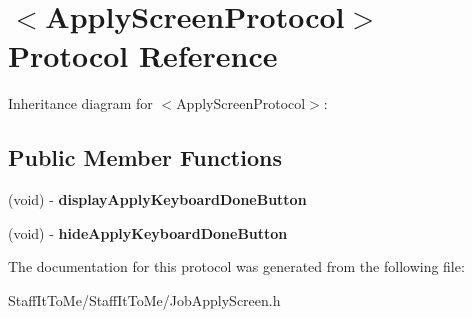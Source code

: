 \hypertarget{protocol_apply_screen_protocol-p}{
\section{$<$\-Apply\-Screen\-Protocol$>$ \-Protocol \-Reference}
\label{protocol_apply_screen_protocol-p}
}


\-Inheritance diagram for $<$\-Apply\-Screen\-Protocol$>$\-:
\subsection*{\-Public \-Member \-Functions}
\begin{DoxyCompactItemize}
\item 
\hypertarget{protocol_apply_screen_protocol-p_af5c7abc5dddd7ac0481b609b16bc2a71}{
(void) -\/ {\bfseries display\-Apply\-Keyboard\-Done\-Button}}
\label{protocol_apply_screen_protocol-p_af5c7abc5dddd7ac0481b609b16bc2a71}

\item 
\hypertarget{protocol_apply_screen_protocol-p_af23ee5c7926c275cd1cb3d11ff5ed398}{
(void) -\/ {\bfseries hide\-Apply\-Keyboard\-Done\-Button}}
\label{protocol_apply_screen_protocol-p_af23ee5c7926c275cd1cb3d11ff5ed398}

\end{DoxyCompactItemize}


\-The documentation for this protocol was generated from the following file\-:\begin{DoxyCompactItemize}
\item 
\-Staff\-It\-To\-Me/\-Staff\-It\-To\-Me/\-Job\-Apply\-Screen.\-h\end{DoxyCompactItemize}
